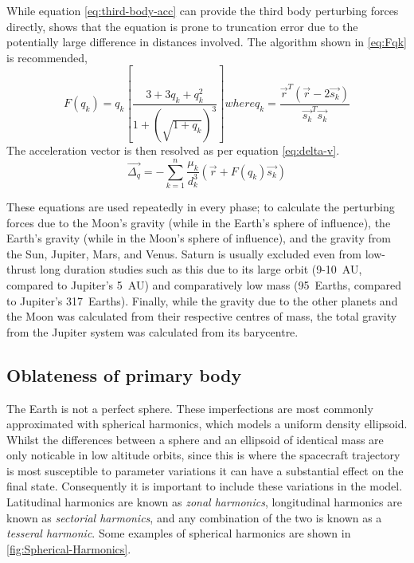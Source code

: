 While equation \eqref{eq:third-body-acc} can provide the third body perturbing forces directly, \textcite{Battin1999} shows that the equation is prone to truncation error due to the potentially large difference in distances involved. The algorithm shown in \eqref{eq:Fqk} is recommended,
\begin{subequations}
\begin{equation} \label{eq:Fqk}
F(q_k) = q_k\left[ \frac{3+3q_{k}+q_{k}^{2}}{1+(\sqrt{1+q_{k}})^{3}} \right] 
\end{equation} 
where
\begin{equation}
q_k = \frac{\vec{r}^{T}(\vec{r}-2\vec{s_{k}})}{\vec{s_k}^{T}\vec{s_k}}
\end{equation}
\end{subequations}
The acceleration vector is then resolved as per equation \eqref{eq:delta-v}.
\begin{equation}\label{eq:delta-v}
\vec{\Delta_q} = -\sum_{k=1}^{n}\frac{\mu_{k}}{d_{k}^{3}}(\vec{r}+F(q_{k})\vec{s_{k}})
\end{equation}

These equations are used repeatedly in every phase; to calculate the perturbing forces due to the Moon's gravity (while in the Earth's sphere of influence), the Earth's gravity (while in the Moon's sphere of influence), and the gravity from the Sun, Jupiter, Mars, and Venus. Saturn is usually excluded even from low-thrust long duration studies such as this due to its large orbit (9-10~AU, compared to Jupiter's 5~AU) and comparatively low mass (95~Earths, compared to Jupiter's 317~Earths). Finally, while the gravity due to the other planets and the Moon was calculated from their respective centres of mass, the total gravity from the Jupiter system was calculated from its barycentre.



\subsection{Oblateness of primary body} \label{sub:Oblateness}

The Earth is not a perfect sphere. These imperfections are most commonly approximated with spherical harmonics, which models a uniform density ellipsoid. Whilst the differences between a sphere and an ellipsoid of identical mass are only noticable in low altitude orbits, since this is where the spacecraft trajectory is most susceptible to parameter variations it can have a substantial effect on the final state. Consequently it is important to include these variations in the model. Latitudinal harmonics are known as \emph{zonal harmonics}, longitudinal harmonics are known as \emph{sectorial harmonics}, and any combination of the two is known as a \emph{tesseral harmonic}. Some examples of spherical harmonics are shown in \autoref{fig:Spherical-Harmonics}.

